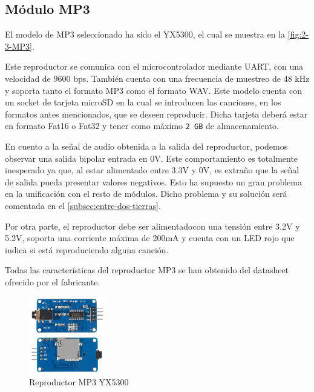 \subsection{Módulo MP3}
El modelo de MP3 seleccionado ha sido el YX5300, el cual se muestra en la \autoref{fig:2-3-MP3}.

Este reproductor se comunica con el microcontrolador mediante UART, con una velocidad de 9600 bps. También cuenta con una frecuencia de muestreo de 48 kHz y soporta tanto el formato MP3 como el formato WAV. Este modelo cuenta con un socket de tarjeta microSD en la cual se introducen las canciones, en los formatos antes mencionados, que se deseen reproducir. Dicha tarjeta deberá estar en formato Fat16 o Fat32 y tener como máximo \texttt{2 GB} de almacenamiento.

En cuento a la señal de audio obtenida a la salida del reproductor, podemos observar una salida bipolar entrada en 0V. Este comportamiento es totalmente inesperado ya que, al estar alimentado entre 3.3V y 0V, es extraño que la señal de salida pueda presentar valores negativos. Esto ha supuesto un gran problema en la unificación con el resto de módulos. Dicho problema y su solución será comentada en el \autoref{subsec:entre-dos-tierras}.

Por otra parte, el reproductor debe ser alimentadocon una tensión entre 3.2V y 5.2V, soporta una corriente máxima de 200mA y cuenta con un LED rojo que indica si está reproduciendo alguna canción.

Todas las características del reproductor MP3 se han obtenido del datasheet ofrecido por el fabricante. \cite{Catalex_MP3_boardPdf}

\begin{figure}[h]
    \centering
    \includegraphics[width=0.3\textwidth]{images/2/2-4/MP3.jpg}
    \caption{Reproductor MP3 YX5300}
    \label{fig:2-3-MP3}
\end{figure}